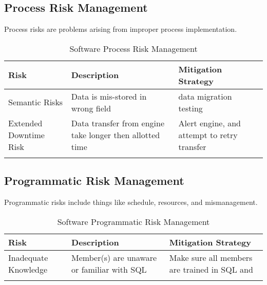 \documentclass[letterpaper,12pt,oneside,listof=totoc]{scrreprt}
\begin{document}
\subsection{Process Risk Management} 
Process risks are problems arising from improper process implementation. 
\begin{longtable}{| p{} | p{} | p{} |} 
    \hline
    \textbf{Risk} & \textbf{Description} & \textbf{Mitigation Strategy} \\
    \hline
    Semantic Risks & Data is mis-stored in wrong field & data migration testing\\
    \hline
    Extended Downtime Risk & Data transfer from engine take longer then allotted time & Alert engine, and attempt to retry transfer\\
    \hline
\caption{Software Process Risk Management}
\end{longtable}

\subsection{Programmatic Risk Management} 
Programmatic risks include things like schedule, resources, and mismanagement. 
\begin{longtable}{| p{} | p{} | p{} |} 
    \hline
    \textbf{Risk} & \textbf{Description} & \textbf{Mitigation Strategy} \\
    \hline
    Inadequate Knowledge & Member(s) are unaware or familiar with SQL & Make sure all members are trained in SQL and \\
    \hline
\caption{Software Programmatic Risk Management}
\end{longtable}

\newpage
\end{document}

